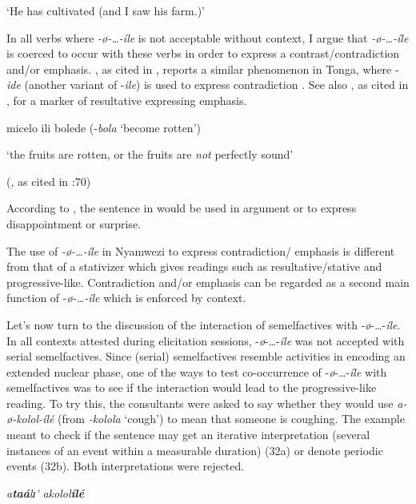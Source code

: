 \documentclass[output=paper,newtxmath,modfonts,nonflat,draftmode]{langsci/langscibook}
\begin{document}
‘He has cultivated (and I saw his farm.)’
\z
\z

In all verbs where \textit{-ø}\textit{-…-íle} is not acceptable without context, I argue that \textit{-ø}\textit{-…-íle} is coerced to occur with these verbs in order to express a contrast/contradiction and/or emphasis. \citet{Collins1962}, as cited in \citet[70]{Crane2012}, reports a similar phenomenon in Tonga, where -\textit{ide} (another variant of -\textit{ile}) is used to express contradiction . See also \citet{Woidich1975}, as cited in \citet[194]{Ebert1995}, for a marker of resultative expressing emphasis. 

\ea \label{ex:kanijo:31}
micelo ili bolede (-\textit{bola} ‘become rotten’)

  ‘the fruits are rotten, or the fruits are \textit{not} perfectly sound’ 


      (\citealt{Collins1962}, as cited in \citealt{Crane2012}:70)
\z

According to \citet{Collins1962}, the sentence in  would be used in argument or to express disappointment or surprise. 

The use of \textit{-ø}\textit{-…-íle} in Nyamwezi to express contradiction/ emphasis is different from that of a stativizer which gives readings such as resultative/stative and progressive-like. Contradiction and/or emphasis can be regarded as a second main function of -\textit{ø-…-íle} which is enforced by context. 

Let’s now turn to the discussion of the interaction of semelfactives with -\textit{ø}-…-\textit{íle}. In all contexts attested during elicitation sessions, -\textit{ø}-…-\textit{íle} was not accepted with serial semelfactives. Since (serial) semelfactives resemble activities in encoding an extended nuclear phase, one of the ways to test co-occurrence of -\textit{ø}-…-\textit{íle} with semelfactives was to see if the interaction would lead to the progressive-like reading. To try this, the consultants were asked to say whether they would use \textit{a-ø}\textit{-kolol-ílé} (from \textit{-kolola} ‘cough’) to mean that someone is coughing. The example meant to check if the sentence may get an iterative interpretation (several instances of an event within a measurable duration) (32a) or denote periodic events (32b). Both interpretations were rejected. 

\ea \label{ex:kanijo:32}
\ea  *\textit{a}\textbf{\textit{taá}}\textit{lɪ}\textit{\'{} }              \textit{akolol}\textbf{\textit{ílé}}
\end{document}
